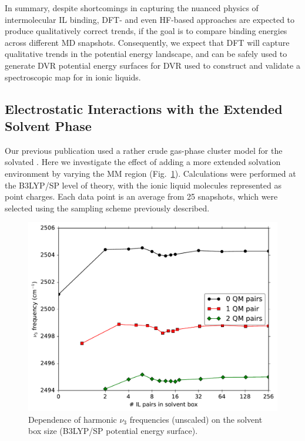 \documentclass[%
  class = book,%
  crop = false,%
  float = true,%
  multi = true,%
  preview = false,%
]{standalone}
\let\cite\autocite
\newcommand{\cotil}{\ce{CO2}\textendash{}IL\xspace}%
\begin{document}
In summary, despite shortcomings in capturing the nuanced physics of intermolecular \cotil binding, DFT- and even HF-based approaches are expected to produce qualitatively correct trends, if the goal is to compare binding energies across different MD snapshots.  Consequently, we expect that DFT will capture qualitative trends in the potential energy landscape, and can be safely used to generate DVR potential energy surfaces for DVR used to construct and validate a spectroscopic map for  in ionic liquids.

\subsection{Electrostatic Interactions with the Extended Solvent Phase}
\label{paper_02:ssec:IIID}

Our previous publication\cite{Brinzer2015} used a rather crude gas-phase cluster model for the solvated . Here we investigate the effect of adding a more extended solvation environment by varying the MM region (Fig.~\ref{paper_02:fig:4}). Calculations were performed at the B3LYP/SP level of theory, with the ionic liquid molecules represented as point charges. Each data point is an average from \num{25} snapshots, which were selected using the sampling scheme previously described.

\begin{figure}
  \centering
  \includegraphics[width=\textwidth]{frequency_same_set_2QM_convergence.pdf}
  \caption[Effect of QM and MM region size on \texorpdfstring{ \(\nu_3\)}{carbon dioxide asymmetric stretch} QM/MM frequencies]{Dependence of harmonic \(\nu_3\) frequencies (unscaled) on the solvent box size (B3LYP/SP potential energy surface).}
  \label{paper_02:fig:4}
\end{figure}
\end{document}
